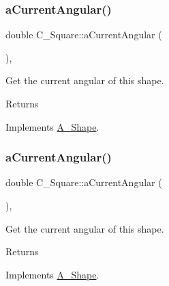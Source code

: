 \subsubsection{\texorpdfstring{a\+Current\+Angular()}{aCurrentAngular()}\hspace{0.1cm}{\footnotesize\ttfamily [1/2]}}
{\footnotesize\ttfamily double C\+\_\+\+Square\+::a\+Current\+Angular (\begin{DoxyParamCaption}{ }\end{DoxyParamCaption})\hspace{0.3cm}{\ttfamily [override]}, {\ttfamily [virtual]}}



Get the current angular of this shape. 

\begin{DoxyReturn}{Returns}

\end{DoxyReturn}


Implements \hyperlink{classA__Shape_a80fa4e009c875dd0ba7fc5bfeeb43f98}{A\+\_\+\+Shape}.

\mbox{\label{classC__Square_ac7779503b305fda4147b735622c66f81}} 
\subsubsection{\texorpdfstring{a\+Current\+Angular()}{aCurrentAngular()}\hspace{0.1cm}{\footnotesize\ttfamily [2/2]}}
{\footnotesize\ttfamily double C\+\_\+\+Square\+::a\+Current\+Angular (\begin{DoxyParamCaption}{ }\end{DoxyParamCaption})\hspace{0.3cm}{\ttfamily [override]}, {\ttfamily [virtual]}}



Get the current angular of this shape. 

\begin{DoxyReturn}{Returns}

\end{DoxyReturn}


Implements \hyperlink{classA__Shape_a80fa4e009c875dd0ba7fc5bfeeb43f98}{A\+\_\+\+Shape}.

\mbox{\label{classC__Square_affd2be59872618d5d1955be360fb73e6}} 

